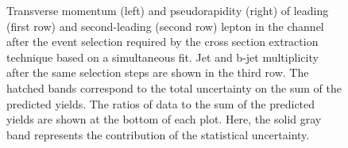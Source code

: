 \begin{figure}[htbp!]
\begin{center}
      \caption{Transverse momentum (left) and pseudorapidity (right)
        of leading (first row) and second-leading (second row) lepton in the \emu channel after the
        event selection required by the \ttbar cross section
        extraction technique based on a simultaneous fit.
        Jet and b-jet multiplicity after the same selection steps are
        shown in the third row. The hatched
        bands correspond to the total uncertainty on the sum of the
        predicted yields. 
        The ratios of data to the sum of the predicted yields are
        shown at the bottom of each plot. Here, the solid gray band
        represents the contribution of the statistical uncertainty.}  
       \label{fig:xsec_emu_ctrplots}
  \end{center}
\end{figure}

